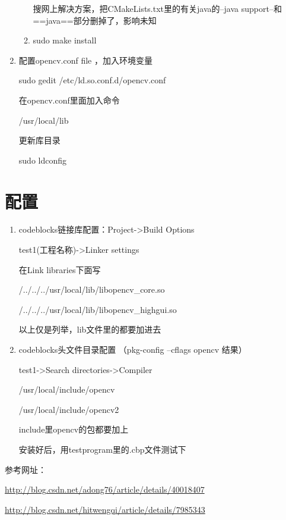 \documentclass[12pt]{article}
\begin{document}
\begin{enumerate}
\begin{enumerate}
搜网上解决方案，把CMakeLists.txt里的有关java的--java support--和==java==部分删掉了，影响未知

\item sudo make install

\end{enumerate}

\item 配置opencv.conf file ，加入环境变量  

sudo gedit /etc/ld.so.conf.d/opencv.conf

在opencv.conf里面加入命令

/usr/local/lib

更新库目录

sudo ldconfig

\begin{comment}

打开文件bash.bashrc  //这个暂时不知道是干嘛的,我没执行, 程序没影响

sudo gedit /etc/bash.bashrc

加入下面两行

PKG\_CONFIG\_PATH=\$PKG\_CONFIG\_PATH:/usr/local/lib/pkgconfig

export PKG\_CONFIG\_PATH\

\end{comment}

\end{enumerate}

\section{配置}

\begin{enumerate}
\item codeblocks链接库配置：Project->Build Options

test1(工程名称)->Linker settings

在Link libraries下面写

/../../../usr/local/lib/libopencv\_core.so

/../../../usr/local/lib/libopencv\_highgui.so

以上仅是列举，lib文件里的都要加进去

\item codeblocks头文件目录配置 （pkg-config --cflags opencv 结果）

test1->Search directories->Compiler

/usr/local/include/opencv

/usr/local/include/opencv2

include里opencv的包都要加上

\begin{comment}

\item CodeBlocks 路文件目录配置

test1->Search directories->Linker

/usr/lib

\end{comment}

安装好后，用testprogram里的.cbp文件测试下

\end{enumerate}

参考网址：

\url{http://blog.csdn.net/adong76/article/details/40018407}
          
\url{http://blog.csdn.net/hitwengqi/article/details/7985343}
\end{document}
